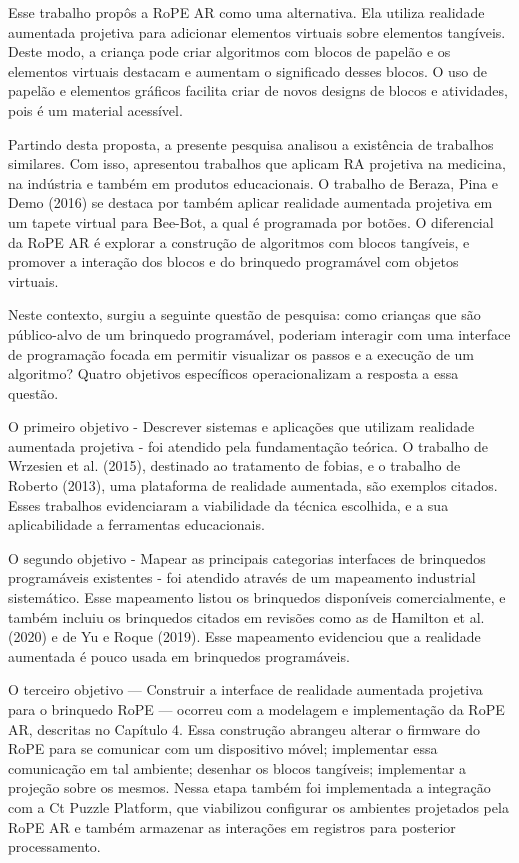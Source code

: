 Esse trabalho propôs a RoPE AR como uma alternativa. Ela utiliza realidade aumentada projetiva para adicionar elementos virtuais sobre elementos tangíveis. Deste modo, a criança pode criar algoritmos com blocos de papelão e os elementos virtuais destacam e aumentam o significado desses blocos. O uso de papelão e elementos gráficos facilita criar de novos designs de blocos e atividades, pois é um material acessível.

Partindo desta proposta, a presente pesquisa analisou a existência de trabalhos similares. Com isso, apresentou trabalhos que aplicam RA projetiva na medicina, na indústria e também em produtos educacionais. O trabalho de Beraza, Pina e Demo (2016) se destaca por também aplicar realidade aumentada projetiva em um tapete virtual para Bee-Bot, a qual é programada por botões. O diferencial da RoPE AR é explorar a construção de algoritmos com blocos tangíveis, e promover a interação dos blocos e do brinquedo programável com objetos virtuais.

Neste contexto, surgiu a seguinte questão de pesquisa: como crianças que são público-alvo de um brinquedo programável, poderiam interagir com uma interface de programação focada em permitir visualizar os passos e a execução de um algoritmo? Quatro objetivos específicos operacionalizam a resposta a essa questão.

O primeiro objetivo - Descrever sistemas e aplicações que utilizam realidade aumentada projetiva - foi atendido pela fundamentação teórica. O trabalho de Wrzesien et al. (2015), destinado ao tratamento de fobias, e o trabalho de Roberto (2013), uma plataforma de realidade aumentada, são exemplos citados. Esses trabalhos evidenciaram a viabilidade da técnica escolhida, e a sua aplicabilidade a ferramentas educacionais. 

O segundo objetivo - Mapear as principais categorias interfaces de brinquedos programáveis existentes - foi atendido através de um mapeamento industrial sistemático. Esse mapeamento listou os brinquedos disponíveis comercialmente, e também incluiu os brinquedos citados em revisões como as de Hamilton et al. (2020) e de Yu e Roque (2019). Esse mapeamento evidenciou que a realidade aumentada é pouco usada em brinquedos programáveis.

O terceiro objetivo — Construir a interface de realidade aumentada projetiva para o brinquedo RoPE — ocorreu com a modelagem e implementação da RoPE AR, descritas no Capítulo 4. Essa construção abrangeu alterar o firmware do RoPE para se comunicar com um dispositivo móvel; implementar essa comunicação em tal ambiente; desenhar os blocos tangíveis; implementar a projeção sobre os mesmos. Nessa etapa também foi implementada a integração com a Ct Puzzle Platform, que viabilizou configurar os ambientes projetados pela RoPE AR e também armazenar as interações em registros para posterior processamento.

